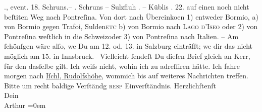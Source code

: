 \begin{ledgroupsized}[t]{13cm}
                  {\pb}\pend
           ., event. 18. Schruns.–\pend
           . Schruns – Sulzfluh\pend
           . \hspace*{4.5em}– Küblis\pend
           . 22. auf einen noch nicht beſti{\geminationm}ten Weg nach Pontreſina. \pend
           \pstart
           Von dort nach Übereinko{\geminationm}en \introOben{}1)\introOben{}
               entweder Bormio, \introOben{}a)\introOben{}
               von Bormio gegen Trafoi, Sulden\textsc{etc} b) von Bormio
               nach \textsc{Lago d’Iseo} oder 2) von Pontreſina weſtlich in die
                  Schweizoder 3) von Pontreſina nach Italien. – Am ſchönſgen wäre alſo, we{\geminationn} Du am 12. od. 13. in Salzburg einträfſt; we{\geminationn} dir das nicht möglich
               am 15. in Innsbruck.– \pend
           \pstart
           Vielleicht ſendeſt Du dieſen Brief gleich an Kerr, für den dasſelbe gilt. Ich weiſs nicht, wohin ich zu adreſſiren hätte.
                  {\pb}\pend
           \pstart
           Ich fahre morgen nach \uline{Iſchl, Rudolfshöhe}, wommich bis auf weiteres Nachrichten treffen. Bitte um recht baldige Verſtändg
                  \textsc{resp} Einverſtändnis.\pend
           \pstart
           Herzlichſtenſt{\\[\baselineskip]}Dein{\\[\baselineskip]}\spacefill\mbox{Arthur}\pend
           \leftskip=0em{}
         
         \endnumbering{}\end{ledgroupsized}\begin{anhang}\end{anhang}\newcommand{\dateiname}{L03176}\newcommand{\titel}{Arthur Schnitzler an Paul Goldmann, 30. 7. 1900}\newcommand{\editorInnen}{Martin Anton Müller und Laura Untner}
      